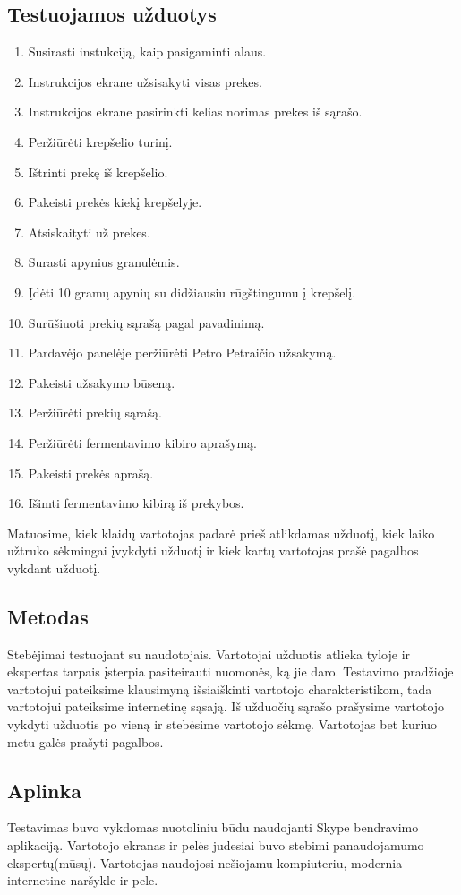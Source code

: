 \documentclass[oneside]{VUMIFPSkursinis}
\begin{document}
	\subsection{Testuojamos užduotys}
		\begin{enumerate}
			\item{Susirasti instukciją, kaip pasigaminti alaus.}
			\item{Instrukcijos ekrane užsisakyti visas prekes.}
			\item{Instrukcijos ekrane pasirinkti kelias norimas prekes iš sąrašo.}
			\item{Peržiūrėti krepšelio turinį.}
			\item{Ištrinti prekę iš krepšelio.}
			\item{Pakeisti prekės kiekį krepšelyje.}
			\item{Atsiskaityti už prekes.}
			\item{Surasti apynius granulėmis.}
			\item{Įdėti 10 gramų apynių su didžiausiu rūgštingumu į krepšelį.}
			\item{Surūšiuoti prekių sąrašą pagal pavadinimą.}
			\item{Pardavėjo panelėje peržiūrėti Petro Petraičio užsakymą.}
			\item{Pakeisti užsakymo būseną.}
			\item{Peržiūrėti prekių sąrašą.}
			\item{Peržiūrėti fermentavimo kibiro aprašymą.}
			\item{Pakeisti prekės aprašą.}
			\item{Išimti fermentavimo kibirą iš prekybos.}
		\end{enumerate}
		Matuosime, kiek klaidų vartotojas padarė prieš atlikdamas užduotį, kiek laiko užtruko sėkmingai įvykdyti užduotį ir kiek kartų vartotojas prašė pagalbos vykdant užduotį.
	\subsection{Metodas}
		Stebėjimai testuojant su naudotojais. Vartotojai užduotis atlieka tyloje ir ekspertas tarpais įsterpia pasiteirauti nuomonės, ką jie daro. Testavimo pradžioje vartotojui pateiksime klausimyną išsiaiškinti vartotojo charakteristikom, tada vartotojui pateiksime internetinę sąsają. Iš užduočių sąrašo prašysime vartotojo vykdyti užduotis po vieną ir stebėsime vartotojo sėkmę. Vartotojas bet kuriuo metu galės prašyti pagalbos. 
	\subsection{Aplinka}
		Testavimas buvo vykdomas nuotoliniu būdu naudojanti Skype bendravimo aplikaciją.
		Vartotojo ekranas ir pelės judesiai buvo stebimi panaudojamumo ekspertų(mūsų).
		Vartotojas naudojosi nešiojamu kompiuteriu, modernia internetine naršykle ir pele.
\end{document}
